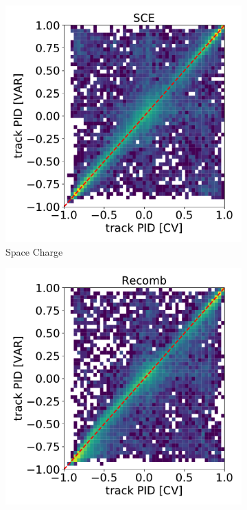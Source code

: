 \documentclass[a4paper]{article}
\begin{document}
\begin{figure}[H] 
\begin{center}
    \begin{subfigure}[b]{0.35\textwidth}
    \centering
    \includegraphics[width=1.00\textwidth]{detsys/tpc/trkpid_corr_03252020_SCE.pdf}
    \caption{\label{fig:detsys:trkpid:SCE}Space Charge}
    \end{subfigure}
    \begin{subfigure}[b]{0.35\textwidth}
    \centering
    \includegraphics[width=1.00\textwidth]{detsys/tpc/trkpid_corr_03252020_Recomb.pdf}

\end{subfigure}
\end{center}
\end{figure}
\end{document}
